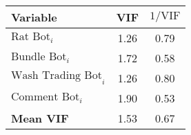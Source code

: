 \begin{tabular}{lcc}
\hline
Variable & VIF & $1/\text{VIF}$ \\
\hline
$\text{Rat Bot}_{i}$ & 1.26 & 0.79 \\
$\text{Bundle Bot}_{i}$ & 1.72 & 0.58 \\
$\text{Wash Trading Bot}_{i}$ & 1.26 & 0.80 \\
$\text{Comment Bot}_{i}$ & 1.90 & 0.53 \\
\hline
\textbf{Mean VIF} & 1.53 & 0.67 \\
\hline
\end{tabular}